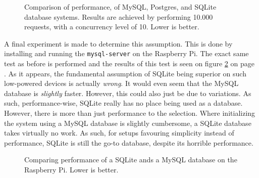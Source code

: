 	\begin{figure}[!h]
		\centering
	    \caption{Comparison of performance, of MySQL, Postgres, and SQLite database systems. Results are achieved by performing 10.000 requests, with a concurrency level of 10. Lower is better.}
	    \label{fig:bench:db}
	\end{figure}

	A final experiment is made to determine this assumption. This is done by installing and running the \verb=mysql-server= on the Raspberry Pi. The exact same test as before is performed and the results of this test is seen on figure \ref{fig:bench:rpi-bench} on page \pageref{fig:bench:rpi-bench}. As it appears, the fundamental assumption of SQLite being superior on such low-powered devices is actually \emph{wrong}. It would even seem that the MySQL database is \emph{slightly} faster. However, this could also just be due to variations. As such, performance-wise, SQLite really has no place being used as a database. However, there is more than just performance to the selection. Where initializing the system using a MySQL database is slightly cumbersome, a SQLite database takes virtually no work. As such, for setups favouring simplicity instead of performance, SQLite is still the go-to database, despite its horrible performance.

	\begin{figure}[!h]
		\centering
	    \caption{Comparing performance of a SQLite ands a MySQL database on the Raspberry Pi. Lower is better.}
	    \label{fig:bench:rpi-bench}
	\end{figure}


